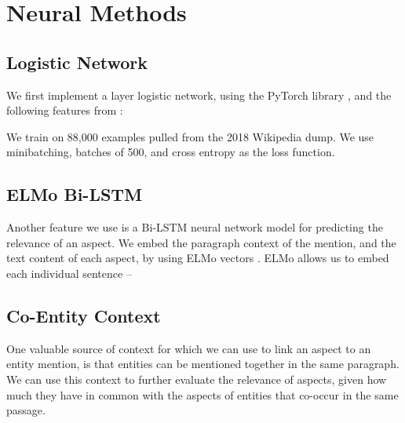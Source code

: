 \documentclass[sigconf,authordraft]{acmart}
\begin{document}
\section{Neural Methods}

\subsection{Logistic Network}\label{jordan-logistic}
We first implement a layer logistic network, using the PyTorch library \cite{pytorch}, and the following features from \cite{nanni2018entity}:


We train on 88,000 examples pulled from the 2018 Wikipedia dump. 
We use minibatching, batches of 500, and cross entropy as the loss function.

\subsection{ELMo Bi-LSTM}\label{jordan-lstm}
Another feature we use is a Bi-LSTM neural network model for predicting the relevance of an aspect.
We embed the paragraph context of the mention, and the text content of each aspect, by using ELMo vectors \cite{elmo}.
ELMo allows us to embed each individual sentence  --

\subsection{Co-Entity Context}\label{jordan-co-entity}
One valuable source of context for which we can use to link an aspect to an entity mention, is that entities can be mentioned together in the same paragraph.
We can use this context to further evaluate the relevance of aspects, given how much they have in common with the aspects of entities that co-occur in the same passage. 
\end{document}
